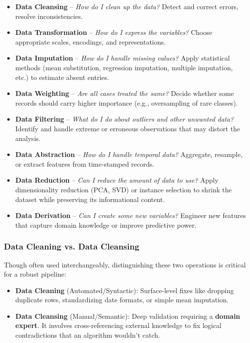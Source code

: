 \documentclass[11pt]{article}
\theoremstyle{smallexample}
\begin{document}
\begin{itemize}
  \item \textbf{Data Cleansing} -- \textit{How do I clean up the data?}
        Detect and correct errors, resolve inconsistencies.


  \item \textbf{Data Transformation} -- \textit{How do I express the variables?}
        Choose appropriate scales, encodings, and representations.

  \item \textbf{Data Imputation} -- \textit{How do I handle missing values?}
        Apply statistical methods (mean substitution, regression imputation, multiple
        imputation, etc.) to estimate absent entries.

  
  \item \textbf{Data Weighting} -- \textit{Are all cases treated the same?}
        Decide whether some records should carry higher importance (e.g., oversampling of
        rare classes).

  
  \item \textbf{Data Filtering} -- \textit{What do I do about outliers and other unwanted data?}
        Identify and handle extreme or erroneous observations that may distort the analysis.

 
  \item \textbf{Data Abstraction} -- \textit{How do I handle temporal data?}
        Aggregate, resample, or extract features from time-stamped records.

  
  \item \textbf{Data Reduction} -- \textit{Can I reduce the amount of data to use?}
        Apply dimensionality reduction (PCA, SVD) or instance selection to shrink the dataset
        while preserving its informational content.

 
  \item \textbf{Data Derivation} -- \textit{Can I create some new variables?}
        Engineer new features that capture domain knowledge or improve predictive power.
\end{itemize}

\subsubsection{Data Cleaning vs. Data Cleansing}

Though often used interchangeably, distinguishing these two operations is critical for a robust pipeline:
\begin{itemize}
    \item \textbf{Data Cleaning} (Automated/Syntactic): Surface-level fixes like dropping duplicate rows, standardizing date formats, or simple mean imputation.
    \item \textbf{Data Cleansing} (Manual/Semantic): Deep validation requiring a \textbf{domain expert}. It involves cross-referencing external knowledge to fix logical contradictions that an algorithm wouldn't catch.
\end{itemize}
\end{document}
